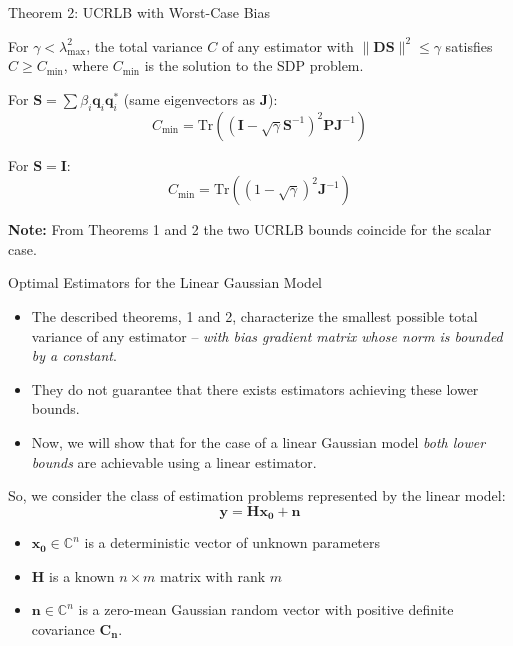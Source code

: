 \documentclass{beamer}
\begin{document}
\begin{frame}{Theorem 2: UCRLB with Worst-Case Bias}
\begin{theorem}[Theorem 2]
For $\gamma < \lambda_{\max}^2$, the total variance $C$ of any estimator with $\|\mathbf{D}\mathbf{S}\|^2 \leq \gamma$ satisfies $C \geq C_{\min}$, where $C_{\min}$ is the solution to the SDP problem.

For $\mathbf{S} = \sum \beta_i\mathbf{q}_i\mathbf{q}_i^*$ (same eigenvectors as $\mathbf{J}$):
\[ C_{\min} = \text{Tr}((\mathbf{I} - \sqrt{\gamma}\mathbf{S}^{-1})^2\mathbf{P}\mathbf{J}^{-1}) \]

For $\mathbf{S} = \mathbf{I}$:
\[ C_{\min} = \text{Tr}((1 - \sqrt{\gamma})^2\mathbf{J}^{-1}) \]
\end{theorem}

\textbf{Note:} From Theorems 1 and 2 the two UCRLB bounds coincide for the scalar case.
\end{frame}


\begin{frame}{Optimal Estimators for the Linear Gaussian Model}
\begin{itemize}
    \item The described theorems, 1 and 2, characterize the smallest possible total variance of any estimator -- 
        \textit{with bias gradient matrix whose norm is bounded by a constant}.
    \item They do not guarantee that there exists estimators achieving these lower bounds.
    \item Now, we will show that for the case of a linear Gaussian model \textit{both lower bounds} are achievable using a linear estimator.
\end{itemize}
\pause
So, we consider the class of estimation problems represented by the linear model:
\[ \mathbf{y} = \mathbf{H} \mathbf{x_0} + \mathbf{n} \]

\scriptsize
\begin{itemize}
    \item \( \mathbf{x_0} \in \mathbb{C}^n \) is a deterministic vector of unknown parameters
    \item  \( \mathbf{H} \) is a known \( n \times m \) matrix with rank \( m \)
    \item \( \mathbf{n} \in \mathbb{C}^n \) is a zero-mean Gaussian random vector with positive definite covariance \( \mathbf{C_n} \).
\end{itemize}
\end{frame}
\end{document}
